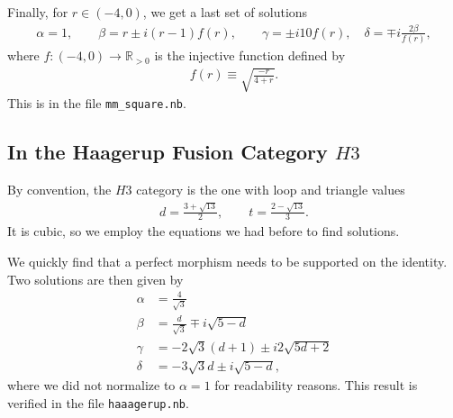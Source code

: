 Finally, for $r \in (-4,0)$, we get a last set of solutions
\begin{align*}
\alpha = 1, \qquad 
\beta = r \pm i (r - 1) f(r) ,\qquad
\gamma = \pm i 10  f(r) ,\quad
\delta = \mp i \frac{2\beta}{f(r)},
\end{align*}
where $f:(-4,0) \rightarrow \mathbb{R}_{>0}$ is the injective function defined by
\begin{align*}
f(r)\equiv \sqrt{\frac{-r}{4+r}}.
\end{align*}
This is in the file \texttt{mm\_square.nb}.

\subsection*{In the Haagerup Fusion Category \texorpdfstring{$H3$}{H3}}
By convention, the $H3$ category is the one with loop and triangle values
\begin{align*}
d = \frac{3 +\sqrt{13}}{2},\qquad t = \frac{2-\sqrt{13}}{3}.
\end{align*}
It is cubic, so we employ the equations we had before to find solutions.

We quickly find that a perfect morphism needs to be supported on the identity. Two solutions are then given by
\begin{align*}
\alpha &= \frac{4}{ \sqrt{3}}   \\[1em]
\beta &=  \frac{d}{\sqrt{3}} \mp i \sqrt{5 - d} \\[1em]
\gamma &= - 2 \sqrt{3}  (d + 1) \pm i2 \sqrt{5d + 2} \\[1em]
\delta &= - 3 \sqrt{3} d \pm i \sqrt{5 - d},
\end{align*}
where we did not normalize to $\alpha = 1$ for readability reasons. This result is verified in the file \texttt{haaagerup.nb}.
